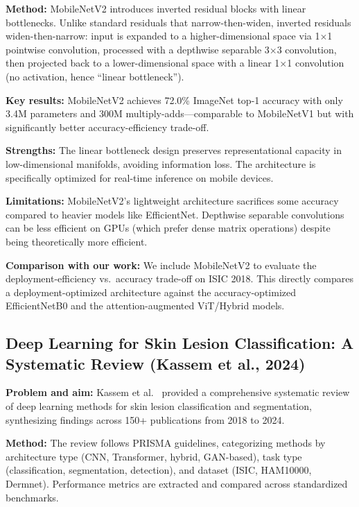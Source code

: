 \documentclass[10pt,twocolumn]{article}
\begin{document}
\textbf{Method:} MobileNetV2 introduces inverted residual blocks with linear bottlenecks. Unlike standard residuals that narrow-then-widen, inverted residuals widen-then-narrow: input is expanded to a higher-dimensional space via 1$\times$1 pointwise convolution, processed with a depthwise separable 3$\times$3 convolution, then projected back to a lower-dimensional space with a linear 1$\times$1 convolution (no activation, hence ``linear bottleneck'').

\textbf{Key results:} MobileNetV2 achieves 72.0\% ImageNet top-1 accuracy with only 3.4M parameters and 300M multiply-adds---comparable to MobileNetV1 but with significantly better accuracy-efficiency trade-off.

\textbf{Strengths:} The linear bottleneck design preserves representational capacity in low-dimensional manifolds, avoiding information loss. The architecture is specifically optimized for real-time inference on mobile devices.

\textbf{Limitations:} MobileNetV2's lightweight architecture sacrifices some accuracy compared to heavier models like EfficientNet. Depthwise separable convolutions can be less efficient on GPUs (which prefer dense matrix operations) despite being theoretically more efficient.

\textbf{Comparison with our work:} We include MobileNetV2 to evaluate the deployment-efficiency vs.\ accuracy trade-off on ISIC 2018. This directly compares a deployment-optimized architecture against the accuracy-optimized EfficientNetB0 and the attention-augmented ViT/Hybrid models.

\subsection{Deep Learning for Skin Lesion Classification: A Systematic Review (Kassem et al., 2024)}

\textbf{Problem and aim:} Kassem et al.\ \cite{Kassem2024} provided a comprehensive systematic review of deep learning methods for skin lesion classification and segmentation, synthesizing findings across 150+ publications from 2018 to 2024.

\textbf{Method:} The review follows PRISMA guidelines, categorizing methods by architecture type (CNN, Transformer, hybrid, GAN-based), task type (classification, segmentation, detection), and dataset (ISIC, HAM10000, Dermnet). Performance metrics are extracted and compared across standardized benchmarks.
\end{document}
